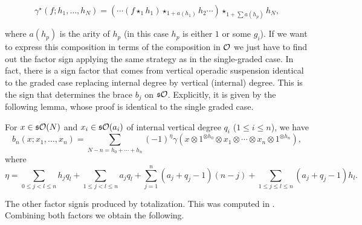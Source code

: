 \documentclass[twoside]{article}
\begin{document}
\[\gamma^\star(f;h_1,\dots, h_N)=(\cdots(f\star_1 h_1)\star_{1+a(h_1)}h_2\cdots)\star_{1+\sum a(h_p)}h_N,\]

where $a(h_p)$ is the arity of $h_p$ (in this case $h_p$ is either $1$ or some $g_i$). If we want to express this composition in terms of the composition in ${\mathcal O}$ we just have to find out the factor sign applying the same strategy as in the single-graded case. In fact, there is a sign factor that comes from vertical operadic suspension identical to the graded case replacing internal degree by vertical (internal) degree. This is the sign that determines the brace $b_j$ on $\mathfrak{s}{\mathcal O}$. Explicitly, it is given by the following lemma, whose proof is identical to the single graded case.


 
 \begin{lem}\label{bigradedsign}
For $x\in \mathfrak{s}{\mathcal O}(N)$ and $x_i\in\mathfrak{s}{\mathcal O}(a_i)$ of internal vertical degree $q_i$ ($1\leq i\leq n$), we have
\[b_n(x;x_1,\dots,x_n)=\sum_{N-n=h_0+\cdots+h_n} (-1)^\eta \gamma
(x\otimes 1^{\otimes h_0}\otimes x_1\otimes \cdots\otimes x_n\otimes1^{\otimes h_n}),\]
where 
\[\eta=\sum_{0\leq j<l\leq n}h_jq_l+\sum_{1\leq j<l\leq n}a_jq_l+\sum_{j=1}^n (a_j+q_j-1)(n-j)+\sum_{1\leq j\leq l\leq n} (a_j+q_j-1)h_l.\]
\end{lem}

The other factor signis  produced by totalization. This was computed in . Combining both factors we obtain the following.
\end{document}
